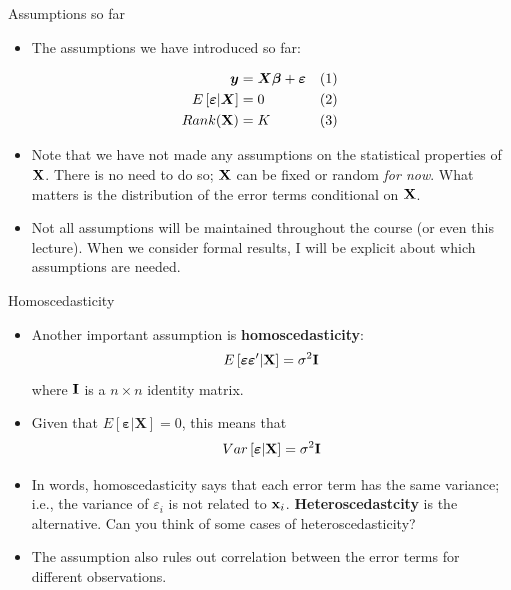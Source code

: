 \begin{frame}{Assumptions so far}
\begin{itemize}
	\item The assumptions we have introduced so far:
\end{itemize}

\begin{align*}
\boldsymbol{y} & =  \boldsymbol{X}\boldsymbol{\beta}+\boldsymbol{\varepsilon}	& (1)\\
E\left[\boldsymbol{\varepsilon}|\boldsymbol{X}\right] & =  0						& (2) \\
Rank({\bf X}) & = K 	& (3)
\end{align*}

\begin{itemize}
	\item Note that we have not made any assumptions on the statistical properties of ${\bf X}$.
	There is no need to do so; ${\bf X}$ can be fixed or random \emph{for now}. What matters
	is the distribution of the error terms conditional on  ${\bf X}$.

	\item Not all assumptions will be maintained throughout the course (or even this lecture).
	When we consider formal results, I will be explicit about which assumptions are needed. 
	
\end{itemize}
\end{frame}

\begin{frame}{Homoscedasticity}
\begin{itemize}
	\item Another important assumption is {\bf homoscedasticity}:\[
		E\left[\boldsymbol{\varepsilon} \boldsymbol{\varepsilon}' | {\bf X} \right] = \sigma^{2} {\bf I}
	\]
	where ${\bf I}$ is a  $n \times n$ identity matrix.

	\medskip
	\item Given that $E\left[\boldsymbol{\varepsilon}|\boldsymbol{X}\right] =  0$, this means that\[
	Var\left[\boldsymbol{\varepsilon} | {\bf X} \right] = \sigma^{2} {\bf I}
	\]

	\item In words, homoscedasticity says that each error term has the same variance; i.e.,   
	the variance of $\varepsilon_i$ is not related to ${\bf x}_i$. {\bf Heteroscedastcity}
	is the alternative. Can you think of some cases of heteroscedasticity? 

	\item The assumption also rules out correlation between the error terms for different observations.
	
\end{itemize}
\end{frame}



